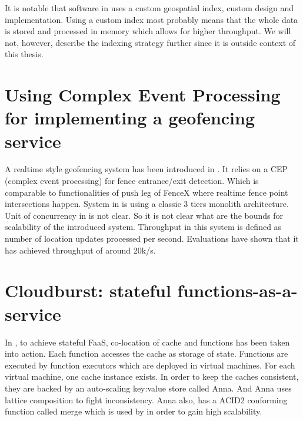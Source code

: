 \documentclass[a4]{report}
\begin{document}
    It is notable that software in \cite{Cirillo-Jacobs-Martin-Szczytowski-2014} uses a custom geospatial index,
    custom design and implementation.
    Using a custom index most probably means that the whole data is stored and processed in memory which allows for
    higher throughput.
    We will not, however, describe the indexing strategy further since it is outside context of this thesis.


    \section{Using Complex Event Processing for implementing a geofencing service}
    A realtime style geofencing system has been introduced in \cite{Nechifor_Comnac_2013}.
    It relies on a CEP (complex event processing) for fence entrance/exit detection.
    Which is comparable to functionalities of push leg of FenceX where realtime fence point intersections happen.
    System in \cite{Nechifor_Comnac_2013} is using a classic 3 tiers monolith architecture.
    Unit of concurrency in \cite{Nechifor_Comnac_2013} is not clear.
    So it is not clear what are the bounds for scalability of the introduced system.
    Throughput in this system is defined as number of location updates processed per second.
    Evaluations have shown that it has achieved throughput of around 20k/s.


    \section{Cloudburst: stateful functions-as-a-service}
    In \cite{Functions-as-a-Service-2020}, to achieve stateful FaaS, co-location of cache and functions has been
    taken into action.
    Each function accesses the cache as storage of state.
    Functions are executed by function executors which are deployed in virtual machines.
    For each virtual machine, one cache instance exists.
    In order to keep the caches consistent, they are backed by an auto-scaling key:value store called Anna.
    And Anna uses lattice composition to fight inconsistency.
    Anna also, has a ACID2 conforming function called merge which is used by \cite{Functions-as-a-Service-2020} in
    order to gain high scalability.
\end{document}
